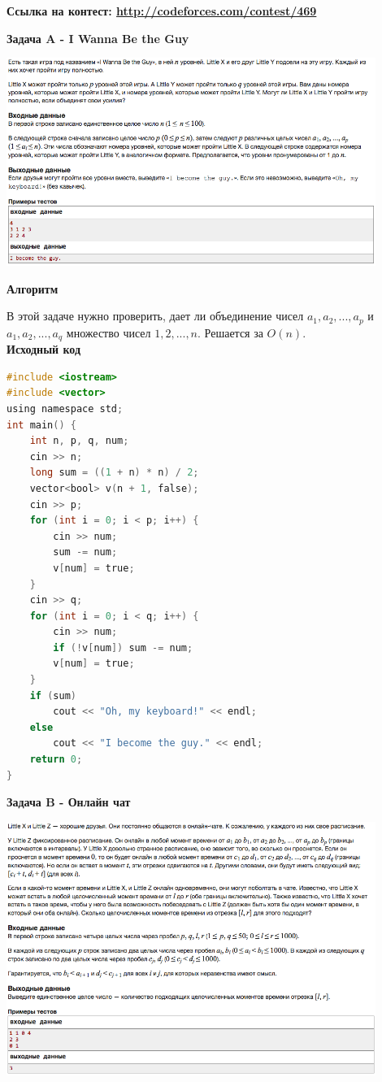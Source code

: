 \documentclass[a4paper,12pt]{article}
\begin{document}
\textbf{{\large Ссылка на контест: \url{http://codeforces.com/contest/469}}}

\newpage
\textbf{{\large Задача A - I Wanna Be the Guy}}

\begin{center}
\includegraphics[width=0.9\textwidth]{C_268/C_268_A.png}\\ [1cm]
\end{center}

\textbf{{\large Алгоритм}}

В этой задаче нужно проверить, дает ли объединение чисел $a_1, a_2, ... , a_p$ и $a_1, a_2, ... , a_q$ множество чисел $1, 2, ... , n$. Решается за $O(n)$.\\

\textbf{{\large Исходный код}} \\
\begin{lstlisting}[language=C]
#include <iostream>
#include <vector>
using namespace std;
int main() {
    int n, p, q, num;
    cin >> n;
    long sum = ((1 + n) * n) / 2;
    vector<bool> v(n + 1, false);
    cin >> p;
    for (int i = 0; i < p; i++) {
        cin >> num;
        sum -= num;
        v[num] = true;
    }
    cin >> q;
    for (int i = 0; i < q; i++) {
        cin >> num;
        if (!v[num]) sum -= num;
        v[num] = true;
    }
    if (sum)
        cout << "Oh, my keyboard!" << endl;
    else
        cout << "I become the guy." << endl;
    return 0;
}
\end{lstlisting}

\newpage
\textbf{{\large Задача B - Онлайн чат}}

\begin{center}
\includegraphics[width=0.9\textwidth]{C_268/C_268_B.png}\\ [1cm]
\end{center}
\end{document}
